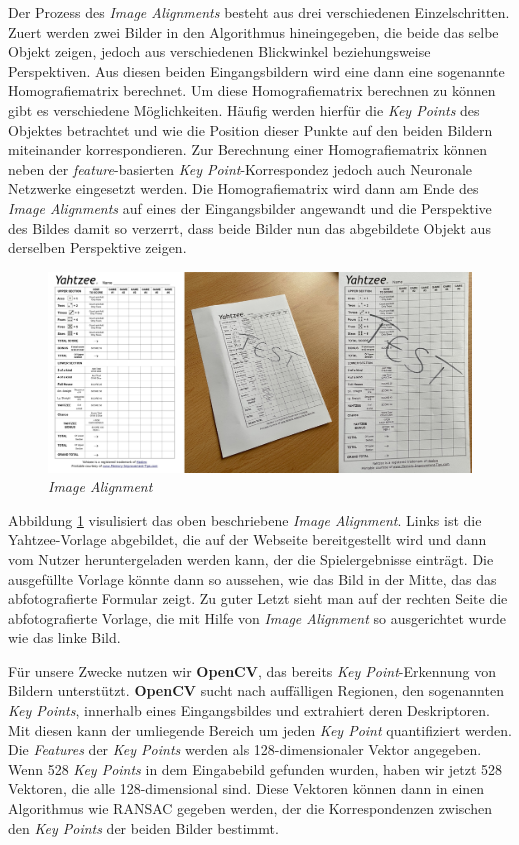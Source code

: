 Der Prozess des \textit{Image Alignments} besteht aus drei verschiedenen Einzelschritten.
Zuert werden zwei Bilder in den Algorithmus hineingegeben, die beide das selbe Objekt zeigen, jedoch aus verschiedenen Blickwinkel beziehungsweise Perspektiven. 
Aus diesen beiden Eingangsbildern wird eine dann eine sogenannte Homografiematrix berechnet. Um diese Homografiematrix berechnen zu können gibt es verschiedene
Möglichkeiten. Häufig werden hierfür die \textit{Key Points} des Objektes betrachtet und wie die Position dieser Punkte auf den beiden Bildern miteinander korrespondieren. 
Zur Berechnung einer Homografiematrix können neben der \textit{feature}-basierten \textit{Key Point}-Korrespondez jedoch auch Neuronale Netzwerke eingesetzt werden. 
Die Homografiematrix wird dann am Ende des \textit{Image Alignments} auf eines der Eingangsbilder angewandt und die Perspektive des Bildes damit so verzerrt, 
dass beide Bilder nun das abgebildete Objekt aus derselben Perspektive zeigen.\cite{rosebrock}

\begin{figure}[H]
	\centering
	\includegraphics[width=\imgMed]{images/practice/image_alignment.jpg}
	\caption{\textit{Image Alignment}} 
	\label{fig:image_alignment}
\end{figure}

Abbildung \ref{fig:image_alignment} visulisiert das oben beschriebene \textit{Image Alignment}. Links ist die Yahtzee-Vorlage abgebildet, die auf der Webseite 
bereitgestellt wird und dann vom Nutzer heruntergeladen werden kann, der die Spielergebnisse einträgt. Die ausgefüllte Vorlage könnte dann so aussehen, wie das 
Bild in der Mitte, das das abfotografierte Formular zeigt. Zu guter Letzt sieht man auf der rechten Seite die abfotografierte Vorlage, die mit Hilfe von 
\textit{Image Alignment} so ausgerichtet wurde wie das linke Bild.

Für unsere Zwecke nutzen wir \textbf{OpenCV}, das bereits \textit{Key Point}-Erkennung von Bildern unterstützt. \textbf{OpenCV} sucht nach auffälligen Regionen,
den sogenannten \textit{Key Points}, innerhalb eines Eingangsbildes und extrahiert deren Deskriptoren. Mit diesen kann der umliegende Bereich um jeden 
\textit{Key Point} quantifiziert werden. Die \textit{Features} der \textit{Key Points} werden als 128-dimensionaler Vektor angegeben. Wenn 528 \textit{Key Points}
in dem Eingabebild gefunden wurden, haben wir jetzt 528 Vektoren, die alle 128-dimensional sind. Diese Vektoren können dann in einen Algorithmus wie RANSAC gegeben
werden, der die Korrespondenzen zwischen den \textit{Key Points} der beiden Bilder bestimmt.

